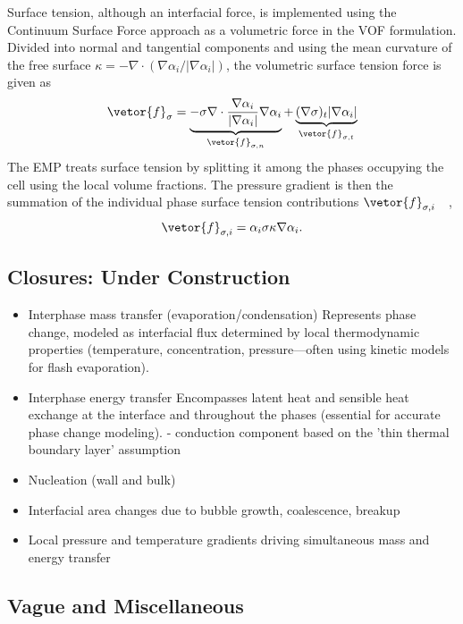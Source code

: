 Surface tension, although an interfacial force, is implemented using the 
 Continuum Surface Force approach as a volumetric force in the VOF formulation.
 Divided into normal and tangential components and using the mean 
 curvature of the free surface 
 $\kappa = - \nabla \cdot \left(\nabla \alpha_{i}/|\nabla \alpha_{i}|\right)$,
 the volumetric surface tension force is given as 
 \begin{equation}
    \vetor{f}_{\sigma} = \underbrace{-\sigma \nabla \cdot \frac{\nabla \alpha_{i}}{|\nabla \alpha_{i}|} \nabla \alpha_{i}}_{\vetor{f}_{\sigma,n}}
     + \underbrace{(\nabla \sigma)_{t}|\nabla \alpha_{i}|}_{\vetor{f}_{\sigma,t}}
 \end{equation}
 The EMP treats surface tension by splitting it among the phases occupying
 the cell using the local volume fractions. The pressure gradient
 is then the summation of the 
 individual phase surface tension contributions $\vetor{f}_{\sigma, i}$~\cite{gadaLargeScaleInterface2017}~,
 \begin{equation}
    \vetor{f}_{\sigma, i} = \alpha_{i} \sigma \kappa \nabla \alpha_{i}.
 \end{equation}

\subsection{Closures: Under Construction}
\begin{itemize}
    \item Interphase mass transfer (evaporation/condensation)
     Represents phase change, modeled as interfacial flux determined
by local thermodynamic properties (temperature, concentration, pressure—often
using kinetic models for flash evaporation).
    \item Interphase energy transfer
     Encompasses latent heat and sensible heat exchange at the interface 
and throughout the phases (essential for accurate phase change modeling).
- conduction component based on the 'thin thermal boundary layer' assumption
    \item Nucleation (wall and bulk)
    \item Interfacial area changes due to bubble growth, coalescence, breakup
    \item Local pressure and temperature gradients driving simultaneous mass and energy transfer
\end{itemize}

\subsection{Vague and Miscellaneous}